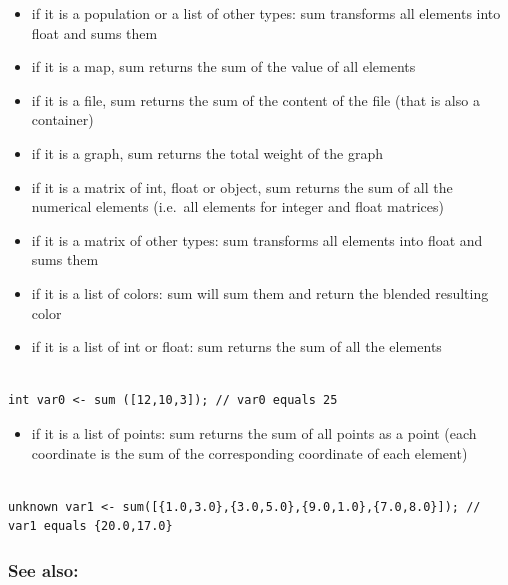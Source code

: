 \documentclass[]{book}
\providecommand{\tightlist}{%
  \setlength{\itemsep}{0pt}\setlength{\parskip}{0pt}}
\theoremstyle{definition}
\theoremstyle{definition}
\theoremstyle{definition}
\theoremstyle{remark}
\begin{document}
\begin{itemize}
\tightlist
\item
  if it is a population or a list of other types: sum transforms all
  elements into float and sums them\\
\item
  if it is a map, sum returns the sum of the value of all elements\\
\item
  if it is a file, sum returns the sum of the content of the file (that
  is also a container)\\
\item
  if it is a graph, sum returns the total weight of the graph\\
\item
  if it is a matrix of int, float or object, sum returns the sum of all
  the numerical elements (i.e.~all elements for integer and float
  matrices)\\
\item
  if it is a matrix of other types: sum transforms all elements into
  float and sums them\\
\item
  if it is a list of colors: sum will sum them and return the blended
  resulting color\\
\item
  if it is a list of int or float: sum returns the sum of all the
  elements
\end{itemize}

\begin{verbatim}
 
int var0 <- sum ([12,10,3]); // var0 equals 25
\end{verbatim}

\begin{itemize}
\tightlist
\item
  if it is a list of points: sum returns the sum of all points as a
  point (each coordinate is the sum of the corresponding coordinate of
  each element)
\end{itemize}

\begin{verbatim}
 
unknown var1 <- sum([{1.0,3.0},{3.0,5.0},{9.0,1.0},{7.0,8.0}]); // var1 equals {20.0,17.0}
\end{verbatim}

\subsubsection{See also:}\label{see-also-199}
\end{document}
